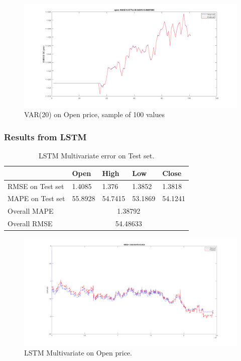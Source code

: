 \documentclass[11pt]{article}
\begin{document}
\begin{figure}[H]
  \centering
  \includegraphics[width=\textwidth,keepaspectratio]{figs/var20open100.png}
  \caption{VAR(20) on Open price, sample of 100 values}
\end{figure}


\subsubsection{Results from LSTM}

\begin{table}[H]
  \centering
\begin{tabular}{|l|l|l|l|l|}
  \hline
                   & Open        & High       & Low        & Close      \\ \hline
  RMSE on Test set & 1.4085      & 1.376      & 1.3852     & 1.3818     \\ \hline
  MAPE on Test set & 55.8928     & 54.7415    & 53.1869    & 54.1241    \\ \hline
  Overall MAPE     & \multicolumn{4}{c|}{1.38792}         \\ \hline
  Overall RMSE     & \multicolumn{4}{c|}{54.48633}        \\ \hline
\end{tabular}
\caption{LSTM Multivariate error on Test set.}
\end{table}


\begin{figure}[H]
  \centering
  \includegraphics[width=\textwidth,keepaspectratio]{figs/lstm_multi_open.png}
  \caption{LSTM Multivariate on Open price.}
\end{figure}
\end{document}
